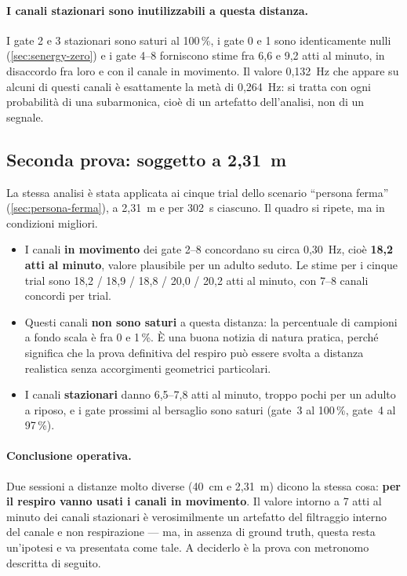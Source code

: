 \paragraph{I canali stazionari sono inutilizzabili a questa distanza.} I gate 2 e 3
stazionari sono saturi al 100\,\%, i gate 0 e 1 sono identicamente nulli
(\cref{sec:senergy-zero}) e i gate 4--8 forniscono stime fra 6,6 e 9,2 atti al
minuto, in disaccordo fra loro e con il canale in movimento. Il valore 0,132~Hz che
appare su alcuni di questi canali è esattamente la metà di 0,264~Hz: si tratta con
ogni probabilità di una subarmonica, cioè di un artefatto dell'analisi, non di un
segnale.

\subsection{Seconda prova: soggetto a 2,31~m}

La stessa analisi è stata applicata ai cinque trial dello scenario ``persona ferma''
(\cref{sec:persona-ferma}), a 2,31~m e per 302~s ciascuno. Il quadro si ripete, ma
in condizioni migliori.

\begin{itemize}[leftmargin=1.4em,itemsep=3pt]
  \item I canali \textbf{in movimento} dei gate 2--8 concordano su circa 0,30~Hz,
        cioè \textbf{18,2 atti al minuto}, valore plausibile per un adulto seduto.
        Le stime per i cinque trial sono 18,2 / 18,9 / 18,8 / 20,0 / 20,2 atti al
        minuto, con 7--8 canali concordi per trial.
  \item Questi canali \textbf{non sono saturi} a questa distanza: la percentuale di
        campioni a fondo scala è fra 0 e 1\,\%. È una buona notizia di natura
        pratica, perché significa che la prova definitiva del respiro può essere
        svolta a distanza realistica senza accorgimenti geometrici particolari.
  \item I canali \textbf{stazionari} danno 6,5--7,8 atti al minuto, troppo pochi per
        un adulto a riposo, e i gate prossimi al bersaglio sono saturi (gate~3 al
        100\,\%, gate~4 al 97\,\%).
\end{itemize}

\paragraph{Conclusione operativa.} Due sessioni a distanze molto diverse (40~cm e
2,31~m) dicono la stessa cosa: \textbf{per il respiro vanno usati i canali in
movimento}. Il valore intorno a 7 atti al minuto dei canali stazionari è
verosimilmente un artefatto del filtraggio interno del canale e non respirazione ---
ma, in assenza di ground truth, questa resta un'ipotesi e va presentata come tale.
A deciderlo è la prova con metronomo descritta di seguito.

